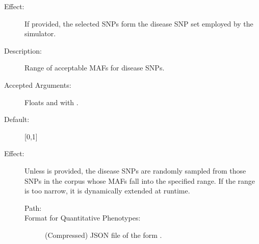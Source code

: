 \documentclass[a4paper,10pt,english]{sphinxhowto}
\begin{document}
\begin{description}
\begin{description}
\begin{description}
\item[{Effect:}] \leavevmode
If provided, the selected SNPs form the disease SNP set employed by the simulator.

\end{description}

\item[{\sphinxcode{\sphinxupquote{-{-}disease-maf-range LB UB}}}] \leavevmode\begin{description}
\item[{Description:}] \leavevmode
Range of acceptable MAFs for disease SNPs.

\item[{Accepted Arguments:}] \leavevmode
Floats  and  with .

\item[{Default:}] \leavevmode
{[}0,1{]}

\item[{Effect:}] \leavevmode
Unless  is provided, the disease SNPs are randomly sampled from those SNPs in the corpus whose MAFs
fall into the specified range. If the range is too narrow, it is dynamically extended at runtime.

\end{description}

\end{description}

\item[{\sphinxstylestrong{Output:}}] \leavevmode\begin{description}
\item[{}] \leavevmode\begin{description}
\item[{Path:}] \leavevmode
{}

\item[{Format for Quantitative Phenotypes:}] \leavevmode
(Compressed) JSON file of the form .


\end{description}
\end{description}
\end{description}
\end{document}
